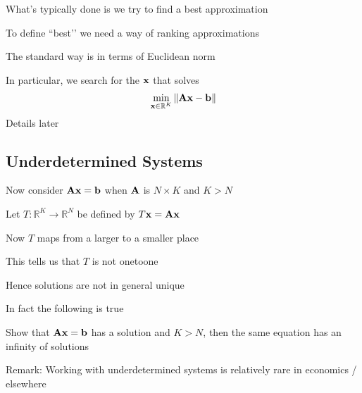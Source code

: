 \documentclass[letterpaper,10pt,english]{jupyterBook}
\begin{document}
\sphinxAtStartPar
What’s typically done is we try to find a best approximation

\sphinxAtStartPar
To define ``best’’ we need a way of ranking approximations

\sphinxAtStartPar
The standard way is in terms of Euclidean norm

\sphinxAtStartPar
In particular, we search for the \({\bf x}\) that solves
\begin{equation*}
\begin{split} \min_{{\bf x} \in \mathbb{R}^K} \| {\bf A} {\bf x} - {\bf b}\|\end{split}
\end{equation*}
\sphinxAtStartPar
Details later


\subsection{Underdetermined Systems}
\label{\detokenize{05.linear_algebra:underdetermined-systems}}
\sphinxAtStartPar
Now consider \({\bf A} {\bf x} = {\bf b}\) when \({\bf A}\) is \(N \times K\) and \(K > N\)

\sphinxAtStartPar
Let \(T \colon \mathbb{R}^K \to \mathbb{R}^N\) be defined by \(T {\bf x} = {\bf A} {\bf x}\)

\sphinxAtStartPar
Now \(T\) maps from a larger to a smaller place

\sphinxAtStartPar
This tells us that \(T\) is not one\sphinxhyphen{}to\sphinxhyphen{}one

\sphinxAtStartPar
Hence solutions are not in general unique

\sphinxAtStartPar
In fact the following is true

\sphinxAtStartPar
{} Show that \({\bf A} {\bf x} =
{\bf b}\) has a solution and \(K > N\), then the same equation has an infinity of solutions

\sphinxAtStartPar
Remark: Working with underdetermined systems is relatively rare in economics / elsewhere
\end{document}

